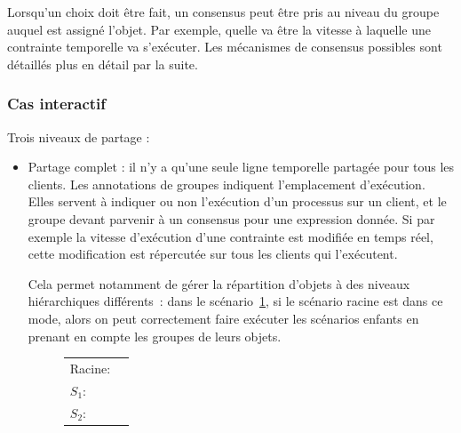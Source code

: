 \documentclass{article}
\begin{document}
Lorsqu'un choix doit être fait, un consensus peut être pris au niveau du groupe auquel est assigné l'objet. 
Par exemple, quelle va être la vitesse à laquelle une contrainte temporelle va s'exécuter.
Les mécanismes de consensus possibles sont détaillés plus en détail par la suite.

\subsubsection{Cas interactif}
Trois niveaux de partage : 

\begin{itemize}
    \item Partage complet : il n'y a qu'une seule ligne temporelle partagée pour tous les clients. 
    Les annotations de groupes indiquent l'emplacement d'exécution. 
    Elles servent à indiquer ou non l'exécution d'un processus sur un client, et le groupe devant parvenir à un consensus pour une expression donnée. 
    Si par exemple la vitesse d'exécution d'une contrainte est modifiée en temps réel, cette modification est répercutée sur tous les clients qui l'exécutent.
    
    Cela permet notamment de gérer la répartition d'objets à des niveaux hiérarchiques différents~: dans le scénario~\ref{scenar.hierarchy}, si le scénario racine est dans ce mode, alors on peut correctement faire exécuter les scénarios enfants en prenant en compte les groupes de leurs objets. 
    
    \begin{figure}[h]
        \centering
        \begin{tabular}{L{3.5em}R{0.3\textwidth}}
            Racine: & \begin{tikzpicture}
            
            \end{tikzpicture} \\
            $S_1$: & \begin{tikzpicture}[scale=0.4, every node/.style={scale=0.6}]
            
            \end{tikzpicture} \\
            $S_2$: & \begin{tikzpicture}[scale=0.6, every node/.style={scale=0.6}]
            
            \end{tikzpicture} \\
        \end{tabular}
        \label{scenar.hierarchy}
    \end{figure}
    

\end{itemize}
\end{document}
